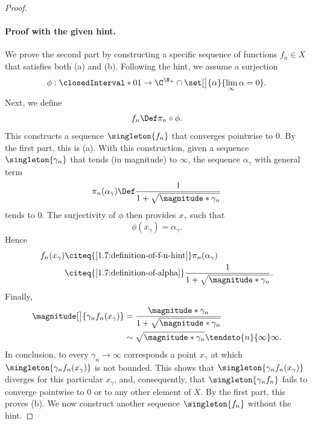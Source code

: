 \begin{proof}
\paragraph{Proof with the given hint.} We prove the second part by constructing a specific sequence of functions $f_n \in X$ %
that satisfies both (a) and (b). Following the hint, we assume a surjection %
%
\begin{equation}
  \phi: \closedInterval*{0}{1} \to \C^{\N_+} \cap \set[\big]{\alpha}{\lim_{\infty} \alpha = 0}.
\end{equation} 
% 
Next, we define 
%
\begin{equation}\label{1.7:definition-of-f-n-hint}
  f_n \Def \pi_n \circ \phi.
\end{equation}
%
This constructs a sequence $\singleton{f_n}$ that converges pointwise to $0$. By the first part, this is (a). With this %
construction, given a sequence $\singleton{\gamma_n}$ that tends (in magnitude) to $\infty$, the sequence $\alpha_\gamma$ with 
general term 
%
\begin{equation}\label{1.7:definition-of-alpha}
  \pi_n(\alpha_\gamma) \Def \frac{1}{1 + \sqrt{\magnitude*{\gamma_n}}}
\end{equation}
%
tends to $0$. The surjectivity of $\phi$ then provides $x_\gamma$ such that 
%
\begin{equation}
  \phi(x_\gamma) = \alpha_\gamma.
\end{equation}
%
Hence
%
\begin{align}
  f_n(x_\gamma) & \citeq{\eqref{1.7:definition-of-f-n-hint}} \pi_n(\alpha_\gamma) \\
  & \citeq{\eqref{1.7:definition-of-alpha}} \frac{1}{1 + \sqrt{\magnitude*{\gamma_n}}}.
\end{align}
%
Finally, 
%
\begin{align}
  \magnitude[\big]{\gamma_n f_n(x_\gamma)} &= \frac{\magnitude*{\gamma_n}}{1 + \sqrt{\magnitude*{\gamma_n}}} \\
  &\sim \sqrt{\magnitude*{\gamma_n}} \tendsto{n}{\infty} \infty. 
\end{align}
%
In conclusion, to every $\gamma_n \to \infty$ corresponds a point $x_\gamma$ at which $\singleton{\gamma_n f_n(x_\gamma)}$ %
is not bounded. This shows that $\singleton{\gamma_n f_n(x_\gamma)}$ diverges for this particular $x_\gamma$, and, %
consequently, that $\singleton{\gamma_n f_n}$ fails to converge pointwise to $0$ or to any other element of $X$. %
By the first part, this proves (b). We now construct another sequence $\singleton{f_n}$ without the hint.
%

\end{proof}

